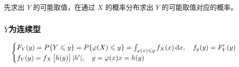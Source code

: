先求出 $Y$ 的可能取值，在通过 $X$ 的概率分布求出 $Y$ 的可能取值对应的概率。

\subsubsection{$Y$为连续型}
\label{ssub:_y_为连续型}

\[
    \begin{cases}
        F_Y(y) = P\{ Y \leqslant y \} =
        P \{ \varphi(X) \leqslant y \} =
        \int_{\varphi(x) \leqslant y} f_X(x) \dif x , \quad f_y(y) = F_Y^{\prime}(y) \\
        f_Y(y) = f_X \left[h(y)\right] | h^{\prime} |,
        \quad y = \varphi(x)  x = h(y)
    \end{cases}
\]
